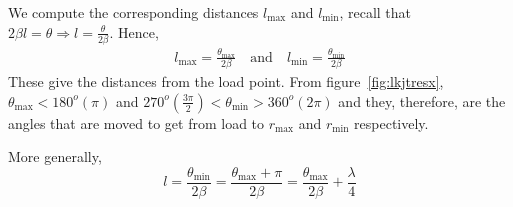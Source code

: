 We compute the corresponding distances $l_\max$ and $l_\min$, 
recall that $2\beta{l} = \theta\Longrightarrow l =\frac{\theta}{2\beta}$. Hence,
\begin{align*}
l_\max = \frac{\theta_\max}{2\beta}\quad\text{and}\quad l_\min = \frac{\theta_\min}{2\beta}
\end{align*}
These give the distances from the load point. From figure~\ref{fig:lkjtresx}, $\theta_\max < 180^o(\pi)$ and $270^o\left(\frac{3\pi}{2}\right) <\theta_\min >360^o(2\pi)$ and they, therefore, are the angles that are moved to get from load to $r_\max$ and $r_\min$ respectively.

More generally,
\begin{dmath}
l = \frac{\theta_\min}{2\beta}
=\frac{\theta_\max + \pi}{2\beta} 
= \frac{\theta_\max}{2\beta} + \frac{\lambda}{4}
\end{dmath}

